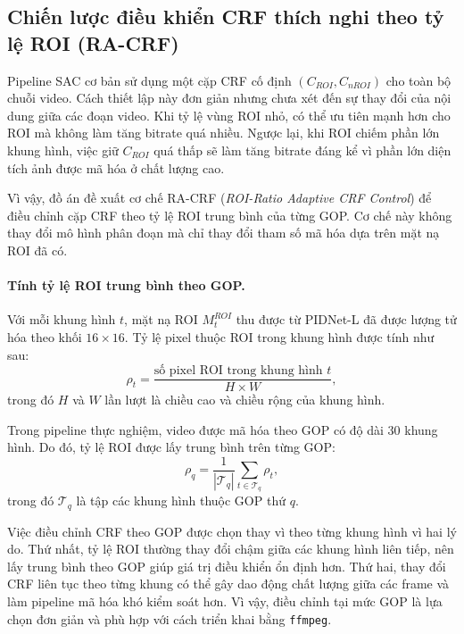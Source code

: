 \subsection{Chiến lược điều khiển CRF thích nghi theo tỷ lệ ROI (RA-CRF)}
\label{subsec:ra-crf}

Pipeline SAC cơ bản sử dụng một cặp CRF cố định $(C_{ROI}, C_{nROI})$ cho toàn bộ chuỗi video. Cách thiết lập này đơn giản nhưng chưa xét đến sự thay đổi của nội dung giữa các đoạn video. Khi tỷ lệ vùng ROI nhỏ, có thể ưu tiên mạnh hơn cho ROI mà không làm tăng bitrate quá nhiều. Ngược lại, khi ROI chiếm phần lớn khung hình, việc giữ $C_{ROI}$ quá thấp sẽ làm tăng bitrate đáng kể vì phần lớn diện tích ảnh được mã hóa ở chất lượng cao.

Vì vậy, đồ án đề xuất cơ chế RA-CRF (\textit{ROI-Ratio Adaptive CRF Control}) để điều chỉnh cặp CRF theo tỷ lệ ROI trung bình của từng GOP. Cơ chế này không thay đổi mô hình phân đoạn mà chỉ thay đổi tham số mã hóa dựa trên mặt nạ ROI đã có.

\paragraph{Tính tỷ lệ ROI trung bình theo GOP.}
Với mỗi khung hình $t$, mặt nạ ROI $M_t^{ROI}$ thu được từ PIDNet-L đã được lượng tử hóa theo khối $16\times16$. Tỷ lệ pixel thuộc ROI trong khung hình được tính như sau:
\begin{equation}
  \rho_t = \frac{\text{số pixel ROI trong khung hình } t}{H \times W},
  \label{eq:rho_t}
\end{equation}
trong đó $H$ và $W$ lần lượt là chiều cao và chiều rộng của khung hình.

Trong pipeline thực nghiệm, video được mã hóa theo GOP có độ dài 30 khung hình. Do đó, tỷ lệ ROI được lấy trung bình trên từng GOP:
\begin{equation}
  \rho_q = \frac{1}{|\mathcal{T}_q|}\sum_{t\in\mathcal{T}_q}\rho_t,
  \label{eq:rho_gop}
\end{equation}
trong đó $\mathcal{T}_q$ là tập các khung hình thuộc GOP thứ $q$.

Việc điều chỉnh CRF theo GOP được chọn thay vì theo từng khung hình vì hai lý do. Thứ nhất, tỷ lệ ROI thường thay đổi chậm giữa các khung hình liên tiếp, nên lấy trung bình theo GOP giúp giá trị điều khiển ổn định hơn. Thứ hai, thay đổi CRF liên tục theo từng khung có thể gây dao động chất lượng giữa các frame và làm pipeline mã hóa khó kiểm soát hơn. Vì vậy, điều chỉnh tại mức GOP là lựa chọn đơn giản và phù hợp với cách triển khai bằng \texttt{ffmpeg}.

